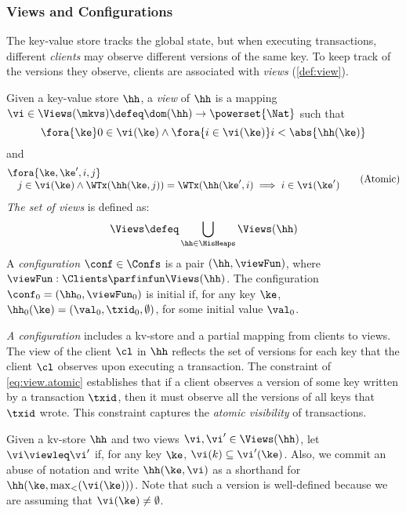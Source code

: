 \subsubsection{Views and Configurations}

The key-value store tracks the global state, 
but when executing transactions,
different \emph{clients} may observe different versions of the same key. 
To keep track of the versions they observe,
clients are associated with \emph{views} (\cref{def:view}). 

\begin{definition}
\label{def:view}
\label{def:cuts}
\label{def:views}
\label{def:configuration}
Given a key-value store $\hh$, a \emph{view} of $\hh$ is a mapping  
$\vi \in \Views(\mkvs) \defeq \dom(\hh) \to\powerset{\Nat}$ such that  
\[
    \fora{ \ke } 
    0 \in \vi(\ke) 
    \wedge \fora{ i \in \vi(\ke) } 
    i < \abs{ \hh(\ke) }
\]
and 
\begin{equation}
\label{eq:view.atomic}
\begin{array}{@{}l@{}}
\fora{ \ke,\ke', i,j} \\
\quad j \in \vi(\ke) 
\wedge \WTx(\hh(\ke, j)) = \WTx(\hh(\ke', i) 
\implies i \in \vi(\ke')
\end{array}
\tag{Atomic}
\end{equation}
\emph{The set of views} is defined as:
\[
\Views \defeq \bigcup_{\hh \in \HisHeaps} \Views(\hh)
\]
A \emph{configuration} $\conf \in \Confs$ is a pair $(\hh, \viewFun)$, 
where $\viewFun : \Clients \parfinfun \Views(\hh)$. 
The configuration $\conf_{0} = (\hh_{0}, \viewFun_{0})$ is 
initial if, for any key $\ke$, $\hh_{0}(\ke) = (\val_0, \txid_0, \emptyset)$, 
for some initial value $\val_0$. 
\end{definition}

\emph{A configuration} includes a kv-store and a partial mapping from clients to views.
The view of the client $\cl$ in $\hh$ reflects the set of versions for each key 
that the client \(\cl \) observes upon executing a transaction. 
The constraint of \cref{eq:view.atomic} establishes that if a client observes 
a version of some key written by a transaction $\txid$, then it must observe all the versions of 
all keys that $\txid$ wrote. This constraint captures the \emph{atomic visibility} of transactions.

Given a kv-store $\hh$ and two views $\vi, \vi' \in \Views(\hh)$, 
let $\vi \viewleq \vi'$ if, for any key $\ke$, $\vi(k) \subseteq \vi'(\ke)$. 
Also, we commit an abuse of notation and write $\hh(\ke, \vi)$ as a shorthand 
for $\hh(\ke, \max_{<}(\vi(\ke)))$. Note that such a version is well-defined because 
we are assuming that $\vi(\ke) \neq \emptyset$.

